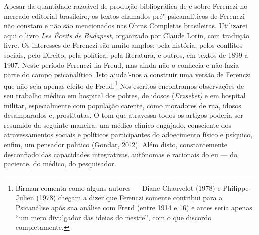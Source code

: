 Apesar da quantidade razoável de produção bibliográfica de e sobre
Ferenczi no mercado editorial brasileiro, os textos chamados
pré"-psicanalíticos de Ferenczi não constam e não são mencionados nas
Obras Completas brasileiras. Utilizarei aqui o livro \emph{Les Écrits de
Budapest}, organizado por Claude Lorin, com tradução livre. Os
interesses de Ferenczi são muito amplos: pela história, pelos conflitos
sociais, pelo Direito, pela política, pela literatura, e outros, em
textos de 1899 a 1907. Neste período Ferenczi lia Freud, mas ainda não o
conhecia e não fazia parte do campo psicanalítico. Isto ajuda"-nos a
construir uma versão de Ferenczi que não seja apenas efeito de
Freud.\footnote{Birman comenta como alguns autores --- Diane Chauvelot
  (1978) e Philippe Julien (1978) chegam a dizer que Ferenczi somente
  contribui para a Psicanálise após sua análise com Freud (entre 1914 e
  16) e antes seria apenas ``um mero divulgador das ideias do mestre'',
  com o que discordo completamente.} Nos escritos encontramos
observações de seu trabalho médico em hospital dos pobres, de idosos
(\emph{Erzsebet)} e em hospital militar, especialmente com população
carente, como moradores de rua, idosos desamparados e, prostitutas. O
tom que atravessa todos os artigos poderia ser resumido da seguinte
maneira: um médico clínico engajado, consciente dos atravessamentos
sociais e políticos participantes do adoecimento físico e psíquico,
enfim, um pensador politico (Gondar, 2012). Além disto, constantemente
desconfiado das capacidades integrativas, autônomas e racionais do eu ---
do paciente, do médico, do pesquisador.


